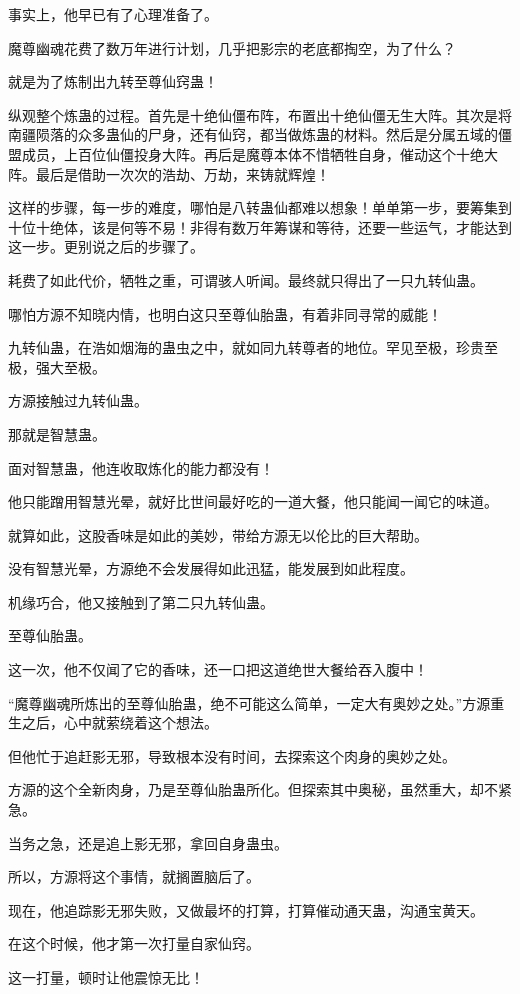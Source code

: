 \begin{this_body}
事实上，他早已有了心理准备了。

魔尊幽魂花费了数万年进行计划，几乎把影宗的老底都掏空，为了什么？

就是为了炼制出九转至尊仙窍蛊！

纵观整个炼蛊的过程。首先是十绝仙僵布阵，布置出十绝仙僵无生大阵。其次是将南疆陨落的众多蛊仙的尸身，还有仙窍，都当做炼蛊的材料。然后是分属五域的僵盟成员，上百位仙僵投身大阵。再后是魔尊本体不惜牺牲自身，催动这个十绝大阵。最后是借助一次次的浩劫、万劫，来铸就辉煌！

这样的步骤，每一步的难度，哪怕是八转蛊仙都难以想象！单单第一步，要筹集到十位十绝体，该是何等不易！非得有数万年筹谋和等待，还要一些运气，才能达到这一步。更别说之后的步骤了。

耗费了如此代价，牺牲之重，可谓骇人听闻。最终就只得出了一只九转仙蛊。

哪怕方源不知晓内情，也明白这只至尊仙胎蛊，有着非同寻常的威能！

九转仙蛊，在浩如烟海的蛊虫之中，就如同九转尊者的地位。罕见至极，珍贵至极，强大至极。

方源接触过九转仙蛊。

那就是智慧蛊。

面对智慧蛊，他连收取炼化的能力都没有！

他只能蹭用智慧光晕，就好比世间最好吃的一道大餐，他只能闻一闻它的味道。

就算如此，这股香味是如此的美妙，带给方源无以伦比的巨大帮助。

没有智慧光晕，方源绝不会发展得如此迅猛，能发展到如此程度。

机缘巧合，他又接触到了第二只九转仙蛊。

至尊仙胎蛊。

这一次，他不仅闻了它的香味，还一口把这道绝世大餐给吞入腹中！

“魔尊幽魂所炼出的至尊仙胎蛊，绝不可能这么简单，一定大有奥妙之处。”方源重生之后，心中就萦绕着这个想法。

但他忙于追赶影无邪，导致根本没有时间，去探索这个肉身的奥妙之处。

方源的这个全新肉身，乃是至尊仙胎蛊所化。但探索其中奥秘，虽然重大，却不紧急。

当务之急，还是追上影无邪，拿回自身蛊虫。

所以，方源将这个事情，就搁置脑后了。

现在，他追踪影无邪失败，又做最坏的打算，打算催动通天蛊，沟通宝黄天。

在这个时候，他才第一次打量自家仙窍。

这一打量，顿时让他震惊无比！


\end{this_body}
